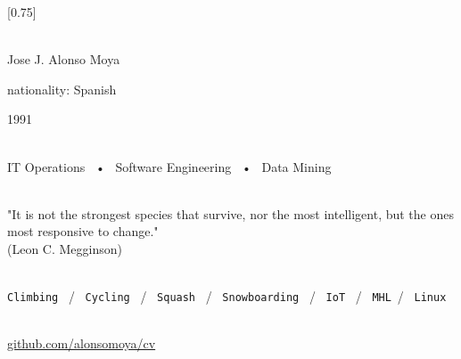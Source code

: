 \documentclass[lighthipster]{simplehipstercv}
\begin{document}
\setlength{\columnsep}{1.5cm}
[0.75]
\begin{paracol}{2}

\paracolbackgroundoptions



\footnotesize
{\setasidefontcolour
\flushright
\begin{center}
\end{center}



 \\[0.5em]
Jose J. Alonso Moya

nationality: Spanish 

1991

\bigskip

 \\[0.5em]

IT Operations ~•~ Software Engineering ~•~ Data Mining

\bigskip



\bigskip

\\[0.5em]

"It is not the strongest species that survive, nor the most intelligent, but the ones most responsive to change." \\
(Leon C. Megginson)
\bigskip

\\[0.5em]

\texttt{Climbing} ~/~ \texttt{Cycling} ~/~ \texttt{Squash} ~/~ \texttt{Snowboarding} ~/~ \texttt{IoT} ~/~ \texttt{MHL}~/~ \texttt{Linux}

\bigskip

\\[0.5em]

\href{https://github.com/alonsomoya/cv}{github.com/alonsomoya/cv}

\vspace{4em}

}
\end{paracol}
\end{document}
